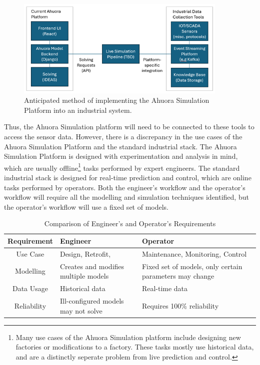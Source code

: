 \documentclass[12pt]{report}
\begin{document}
\begin{figure}
    \centering
    \includegraphics[width=0.9\textwidth]{architecture.png}
    \caption{Anticipated method of implementing the Ahuora Simulation Platform into an industrial system.}
    \label{fig:architecture}
\end{figure}

 Thus, the Ahuora Simulation platform will need to be connected to these tools to access the sensor data. However, there is a discrepancy in the use cases of the Ahuora Simulation Platform and the standard industrial stack. The Ahuora Simulation Platform is designed with experimentation and analysis in mind, which are usually offline\footnote{Many use cases of the Ahuora Simulation platform include designing new factories or modifications to a factory. These tasks mostly use historical data, and are a distinctly seperate problem from live prediction and control.} tasks performed by expert engineers. The standard industrial stack is designed for real-time prediction and control, which are online tasks performed by operators. Both the engineer's workflow and the operator's workflow will require all the modelling and simulation techniques identified, but the operator's workflow will use a fixed set of models.

\begin{table}[ht]
    \centering
    \caption{Comparison of Engineer's and Operator's Requirements}
    \begin{tabular}{|c|p{}|p{}|}
        \hline
        \textbf{Requirement} & \textbf{Engineer} & \textbf{Operator} \\
        \hline
        Use Case & Design, Retrofit, & Maintenance, Monitoring, Control \\
        \hline
        Modelling & Creates and modifies multiple models & Fixed set of models, only certain parameters may change\\
        \hline
        Data Usage & Historical data & Real-time data \\
        \hline
        Reliability & Ill-configured models may not solve & Requires 100\% reliability \\
        \hline
    \end{tabular}
    \label{tab:requirements}
\end{table}
\end{document}
